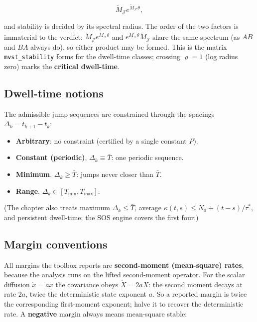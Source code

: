 \documentclass[11pt,oneside]{report}
\newcommand{\code}[1]{\texttt{#1}}
\providecommand{\tightlist}{\setlength{\itemsep}{0pt}\setlength{\parskip}{0pt}}
\begin{document}
\[\widetilde M_{\mathcal{J}} e^{\widetilde M_{\mathcal{F}}\theta},\]

and stability is decided by its spectral radius. The order of the two factors is
immaterial to the verdict: \(\widetilde M_{\mathcal{J}}e^{\widetilde M_{\mathcal{F}}\theta}\)
and \(e^{\widetilde M_{\mathcal{F}}\theta}\widetilde M_{\mathcal{J}}\) share the
same spectrum (as \(AB\) and \(BA\) always do), so either product may be formed. This
is the matrix \code{mvst\_stability} forms for the dwell-time classes; crossing \(\varrho=1\)
(log radius zero) marks the \textbf{critical dwell-time}.

\hypertarget{dwell-time-notions}{%
\subsection{Dwell-time notions}\label{dwell-time-notions}}

The admissible jump sequences are constrained through the spacings
\(\Delta_k=t_{k+1}-t_k\):

\begin{itemize}
\tightlist
\item
  \textbf{Arbitrary}: no constraint (certified by a single constant \(P\)).
\item
  \textbf{Constant (periodic)}, \(\Delta_k\equiv\bar T\): one periodic sequence.
\item
  \textbf{Minimum}, \(\Delta_k\ge\bar T\): jumps never closer than \(\bar T\).
\item
  \textbf{Range}, \(\Delta_k\in[T_{\min},T_{\max}]\).
\end{itemize}

(The chapter also treats maximum \(\Delta_k\le\bar T\), average
\(\kappa(t,s)\le N_0+(t-s)/\tau^{*}\), and persistent dwell-time; the SOS engine
covers the first four.)

\hypertarget{margin-conventions}{%
\subsection{Margin conventions}\label{margin-conventions}}

All margins the toolbox reports are \textbf{second-moment (mean-square) rates},
because the analysis runs on the lifted second-moment operator. For the scalar
diffusion \(\dot x=ax\) the covariance obeys \(\dot X=2aX\): the second moment decays
at rate \(2a\), twice the deterministic state exponent \(a\). So a reported margin is
twice the corresponding first-moment exponent; halve it to recover the
deterministic rate. A \textbf{negative} margin always means mean-square stable:
\end{document}
